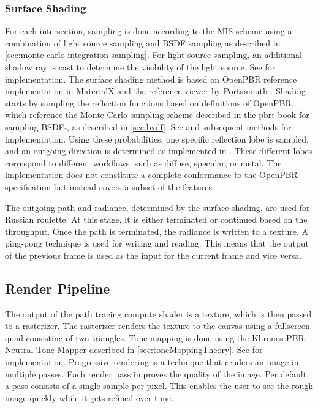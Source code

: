 \subsubsection{Surface Shading}

For each intersection, sampling is done according to the \gls{MIS} scheme using a combination of light source sampling and \gls{BSDF} sampling as described in \autoref{sec:monte-carlo-integration-sampling}. For light source sampling, an additional shadow ray is cast to determine the visibility of the light source. See  for implementation. The surface shading method is based on \gls{OpenPBR} reference implementation in \gls{MaterialX} and the reference viewer by Portsmouth \cite{openPbrViewer}. Shading starts by sampling the reflection functions based on definitions of \gls{OpenPBR}, which reference the Monte Carlo sampling scheme described in the \gls{pbrt} book \cite{Pharr_Physically_Based_Rendering_2023} for sampling \glspl{BSDF}, as described in \autoref{sec:bxdf}. See  and subsequent methods for implementation. Using these probabilities, one specific reflection lobe is sampled, and an outgoing direction is determined as implemented in . These different lobes correspond to different workflows, such as diffuse, specular, or metal. The implementation does not constitute a complete conformance to the \gls{OpenPBR} specification but instead covers a subset of the features.

The outgoing path and radiance, determined by the surface shading, are used for Russian roulette. At this stage, it is either terminated or continued based on the throughput. Once the path is terminated, the radiance is written to a texture. A ping-pong technique is used for writing and reading. This means that the output of the previous frame is used as the input for the current frame and vice versa.

\subsection*{Render Pipeline}

The output of the path tracing compute shader is a texture, which is then passed to a rasterizer. The rasterizer renders the texture to the canvas using a fullscreen quad consisting of two triangles. Tone mapping is done using the Khronos \gls{PBR} Neutral Tone Mapper described in \autoref{sec:toneMappingTheory}. See  for implementation. Progressive rendering is a technique that renders an image in multiple passes. Each render pass improves the quality of the image. Per default, a pass consists of a single sample per pixel. This enables the user to see the rough image quickly while it gets refined over time.


